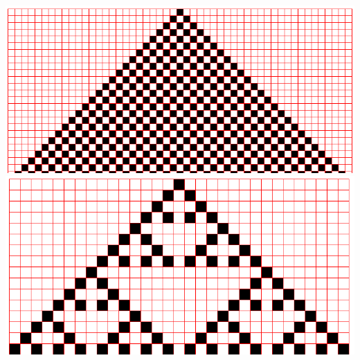 \documentclass[11pt,class=report,crop=false]{standalone}
\begin{document}
\begin{activite}
\begin{enumerate}
\begin{center}
\includegraphics[scale=\myscale,scale=0.2]{ecran-automate-4}
\includegraphics[scale=\myscale,scale=0.2]{ecran-automate-5}
\end{center}	


\end{enumerate}
\end{activite}
\end{document}
